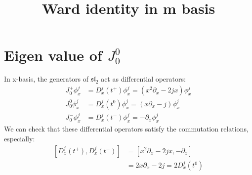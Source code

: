 \documentclass[10pt,a4paper]{article}
\numberwithin{equation}{section}
\begin{document}
\title{Ward identity in m basis}
\maketitle

\section{Eigen value of $J^{0}_{0}$}

In x-basis, the generators of $\mathfrak{sl}_{2}$ act as differential operators: 
\begin{equation}
    \begin{aligned}
    J^{+}_{0} \phi^{j}_{x} &= D^{j}_{x}(t^{+}) \phi^{j}_{x} = (x^{2} \partial_{x} - 2j x)\phi^{j}_{x}\\
    J^{0}_{0} \phi^{j}_{x} &= D^{j}_{x}(t^{0}) \phi^{j}_{x} = (x \partial_{x} - j) \phi^{j}_{x}\\
    J^{-}_{0} \phi^{j}_{x} &= D^{j}_{x}(t^{-}) \phi^{j}_{x} = - \partial_{x} \phi^{j}_{x}
    \end{aligned}
\end{equation}
We can check that these differential operators satisfy the commutation relations, especially:
\begin{equation}
    \begin{aligned}
    \left[D^{j}_{x}(t^{+}),D^{j}_{x}(t^{-})\right] &= \left[ x^{2} \partial_{x} - 2 j x, -\partial_{x} \right]\\
    &= 2x \partial_{x} - 2 j = 2 D^{j}_{x}(t^{0})
    \end{aligned}
\end{equation}
\end{document}
